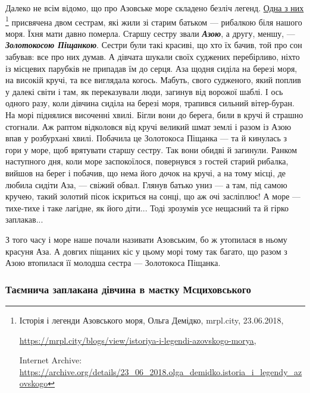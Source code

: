 
Далеко не всім відомо, що про Азовське море складено безліч легенд. \href{https://archive.org/details/23_06_2018.olga_demidko.istoria_i_legendy_azovskogo}{Одна з них}%
\footnote{Історія і легенди Азовського моря, Ольга Демідко, mrpl.city, 23.06.2018, \par%
\url{https://mrpl.city/blogs/view/istoriya-i-legendi-azovskogo-morya}, \par%
Internet Archive: \url{https://archive.org/details/23_06_2018.olga_demidko.istoria_i_legendy_azovskogo}%
} присвячена двом сестрам, які жили зі старим батьком — рибалкою біля нашого
моря. Їхня мати давно померла. Старшу сестру звали \emph{\textbf{Азою}}, а другу, меншу, —
\emph{\textbf{Золотокосою Піщанкою}}. Сестри були такі красиві, що хто їх бачив, той про сон
забував: все про них думав. А дівчата шукали своїх суджених перебірливо, ніхто
із місцевих парубків не припадав їм до серця. Аза щодня сиділа на березі моря,
на високій кручі, та все виглядала когось. Мабуть, свого судженого, який поплив
у далекі світи і там, як переказували люди, загинув від ворожої шаблі. І ось
одного разу, коли дівчина сиділа на березі моря, трапився сильний вітер-буран.
На морі піднялися височенні хвилі. Бігли вони до берега, били в кручі й страшно
стогнали. Аж раптом відколовся від кручі великий шмат землі і разом із Азою
впав у розбурхані хвилі. Побачила це Золотокоса Піщанка — та й кинулась з гори
у море, щоб врятувати старшу сестру. Так вони обидві й загинули. Ранком
наступного дня, коли море заспокоїлося, повернувся з гостей старий рибалка,
вийшов на берег і побачив, що нема його дочок на кручі, а на тому місці, де
любила сидіти Аза, — свіжий обвал. Глянув батько униз — а там, під самою
кручею, такий золотий пісок іскриться на сонці, що аж очі засліплює! А море —
тихе-тихе і таке лагідне, як його діти... Тоді зрозумів усе нещасний та й гірко
заплакав...

З того часу і море наше почали називати Азовським, бо ж утопилася в ньому
красуня Аза. А довгих піщаних кіс у цьому морі тому так багато, що разом з Азою
втопилася її молодша сестра — Золотокоса Піщанка.

\subsubsection{Таємнича заплакана дівчина в маєтку Мсциховського}


